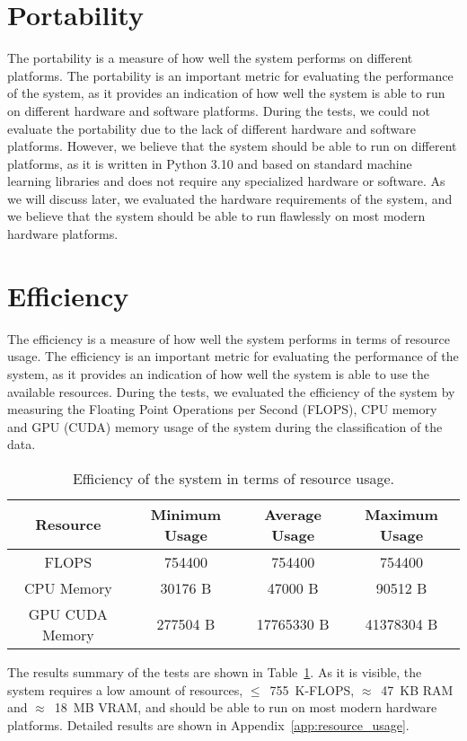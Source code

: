 \section{Portability}
The portability is a measure of how well the system performs on different platforms.
The portability is an important metric for evaluating the performance of the system, as it provides an indication of how well the system is able to run on different hardware and software platforms.
During the tests, we could not evaluate the portability due to the lack of different hardware and software platforms.
However, we believe that the system should be able to run on different platforms, as it is written in Python 3.10 and based on standard machine learning libraries and does not require any specialized hardware or software.
As we will discuss later, we evaluated the hardware requirements of the system, and we believe that the system should be able to run flawlessly on most modern hardware platforms.

\section{Efficiency}
The efficiency is a measure of how well the system performs in terms of resource usage.
The efficiency is an important metric for evaluating the performance of the system, as it provides an indication of how well the system is able to use the available resources.
During the tests, we evaluated the efficiency of the system by measuring the Floating Point Operations per Second (FLOPS), CPU memory and GPU (CUDA) memory usage of the system during the classification of the data.

\begin{table}[!htbp]
    \centering
    \begin{tabular}{|c||c|c|c|}
        \hline
        \textbf{Resource} & \textbf{Minimum Usage} & \textbf{Average Usage} & \textbf{Maximum Usage} \\
        \hline
        \hline
        FLOPS & 754400 & 754400 & 754400\\
        \hline
        CPU Memory & 30176 B & 47000 B & 90512 B \\
        \hline
        GPU CUDA Memory & 277504 B & 17765330 B  & 41378304 B \\
        \hline
    \end{tabular}
    \caption{Efficiency of the system in terms of resource usage.}\label{tab:efficiency}
\end{table}
The results summary of the tests are shown in Table~\ref{tab:efficiency}.
As it is visible, the system requires a low amount of resources, $\le$~755~K-FLOPS, $\approx$~47~KB RAM and $\approx$~18~MB VRAM, and should be able to run on most modern hardware platforms.
Detailed results are shown in Appendix~\ref{app:resource_usage}.

